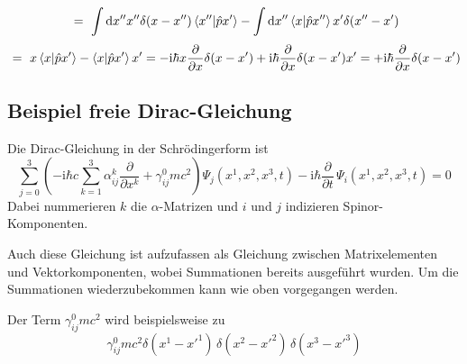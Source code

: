 \documentclass[12pt]{article}
\begin{document}
\begin{equation*}
\ =\ \int \mathrm{d}x'' x''\delta(x-x'') \bra{x''}\ket{\hat{p}x'} 
- \int \mathrm{d}x'' \bra{x}\ket{\hat{p}x''} x'\delta(x''-x')
\end{equation*}
\begin{equation*}
\ =\ x \bra{x}\ket{\hat{p}x'} - \bra{x}\ket{\hat{p}x'} x'
= -\mathrm {i} \hbar x \frac{\partial }{\partial x}\delta(x-x')
+\mathrm{i} \hbar \frac{\partial }{\partial x}\delta(x-x') x'
= +\mathrm{i} \hbar \frac{\partial }{\partial x}\delta(x-x')
\end{equation*}

\subsection{Beispiel freie Dirac-Gleichung}
Die Dirac-Gleichung in der Schrödingerform ist
\begin{equation*}
\sum_{j=0}^{3}\left(-\mathrm{i}\hbar c \sum_{k=1}^{3}\alpha^{k}_{ij}\frac{\partial }{\partial x^k}+\gamma^{0}_{ij} m c^2 \right)\Psi_j(x^1,x^2,x^3,t) 
- {\mathrm i}\hbar{\frac  {\partial }{\partial t}}\,\Psi_i(x^1,x^2,x^3,t) = 0
\end{equation*}
Dabei nummerieren $k$ die $\alpha$-Matrizen und $i$ und $j$ indizieren Spinor-Komponenten.

Auch diese Gleichung ist aufzufassen als Gleichung zwischen Matrixelementen und Vektorkomponenten, wobei Summationen bereits ausgeführt wurden. Um die Summationen wiederzubekommen kann wie oben vorgegangen werden. 

Der Term $\gamma^{0}_{ij} m c^2$ wird beispielsweise zu 
\begin{equation*}
\gamma^{0}_{ij} m c^2 \delta(x^1-{x'}^1)\,\delta(x^2-{x'}^2)\,\delta(x^3-{x'}^3)
\end{equation*}
\end{document}
